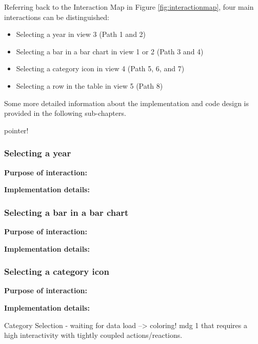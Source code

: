 Referring back to the Interaction Map in Figure \ref{fig:interactionmap}, four main interactions can be distinguished:
\begin{itemize}[noitemsep,nolistsep]
	\item Selecting a year in view 3 (Path 1 and 2)
	\item Selecting a bar in a bar chart in view 1 or 2 (Path 3 and 4)
	\item Selecting a category icon in view 4 (Path 5, 6, and 7)
	\item Selecting a row in the table in view 5 (Path 8)
\end{itemize}
Some more detailed information about the implementation and code design is provided in the following sub-chapters.

pointer!


\subsubsection{Selecting a year}

\textbf{Purpose of interaction:}

\textbf{Implementation details:}


\subsubsection{Selecting a bar in a bar chart}

\textbf{Purpose of interaction:}

\textbf{Implementation details:}


\subsubsection{Selecting a category icon}

\textbf{Purpose of interaction:}

\textbf{Implementation details:}


Category Selection - waiting for data load --> coloring!
\gls{mdg} 1 that requires a high interactivity with tightly coupled actions/reactions.



